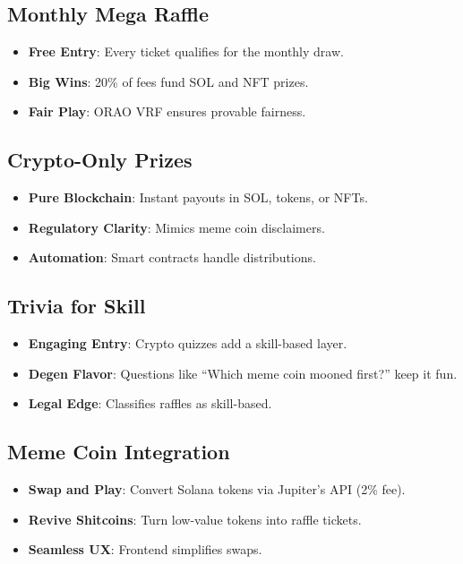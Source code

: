 \documentclass[12pt]{article}
\begin{document}
\subsection{Monthly Mega Raffle}
\begin{itemize}
    \item \textbf{Free Entry}: Every ticket qualifies for the monthly draw.
    \item \textbf{Big Wins}: 20\% of fees fund SOL and NFT prizes.
    \item \textbf{Fair Play}: ORAO VRF ensures provable fairness.
\end{itemize}

\subsection{Crypto-Only Prizes}
\begin{itemize}
    \item \textbf{Pure Blockchain}: Instant payouts in SOL, tokens, or NFTs.
    \item \textbf{Regulatory Clarity}: Mimics meme coin disclaimers.
    \item \textbf{Automation}: Smart contracts handle distributions.
\end{itemize}

\subsection{Trivia for Skill}
\begin{itemize}
    \item \textbf{Engaging Entry}: Crypto quizzes add a skill-based layer.
    \item \textbf{Degen Flavor}: Questions like “Which meme coin mooned first?” keep it fun.
    \item \textbf{Legal Edge}: Classifies raffles as skill-based.
\end{itemize}

\subsection{Meme Coin Integration}
\begin{itemize}
    \item \textbf{Swap and Play}: Convert Solana tokens via Jupiter’s API (2\% fee).
    \item \textbf{Revive Shitcoins}: Turn low-value tokens into raffle tickets.
    \item \textbf{Seamless UX}: Frontend simplifies swaps.
\end{itemize}
\end{document}
